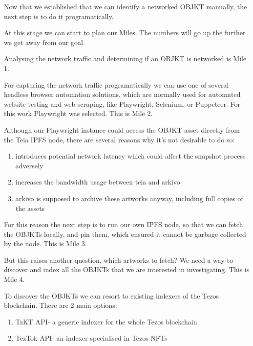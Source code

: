 Now that we established that we can identify a networked OBJKT manually, the next step is to do it programatically.

At this stage we can start to plan our Miles. The numbers will go up the further we get away from our goal.

Analysing the network traffic and determining if an OBJKT is networked is Mile 1.


For capturing the network traffic programatically we can use one of several headless browser automation solutions, which are normally used for automated website testing and web-scraping, like Playwright\footnotemark[2], Selenium\footnotemark[3], or Puppeteer\footnotemark[4]. For this work Playwright was selected. This is Mile 2.



Although our Playwright instance could access the OBJKT asset directly from the Teia IPFS node, there are several reasons why it's not desirable to do so:

\begin{enumerate}
	\item introduces potential network latency which could affect the snapshot process adversely
	\item increases the bandwidth usage between teia and arkivo
	\item arkivo is supposed to archive these artworks anyway, including full copies of the assets
\end{enumerate}

For this reason the next step is to run our own IPFS node, so that we can fetch the OBJKTs locally, and pin them, which ensured it cannot be garbage collected by the node. This is Mile 3.

But this raises another question, which artworks to fetch? We need a way to discover and index all the OBJKTs that we are interested in investigating. This is Mile 4.

To discover the OBJKTs we can resort to existing indexers of the Tezos blockchain. There are 2 main options:

\begin{enumerate}
	\item TzKT API\footnotemark[5] - a generic indexer for the whole Tezos blockchain
	\item TezTok API\footnotemark[6] - an indexer specialised in Tezos NFTs
\end{enumerate}

